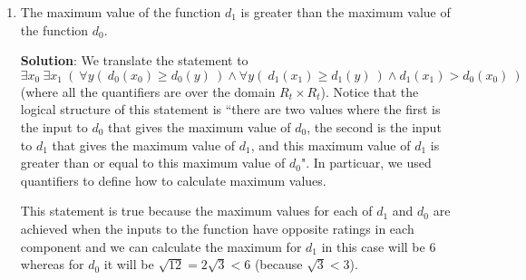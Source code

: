 \begin{enumerate}
\begin{enumerate}
\begin{enumerate}
            {\bf Solution}: We translate the statement to 
            \[
              \forall x \in Rt \times Rt ~(~d_0 (x) > d_1 (x)~)
            \]
            This statement is {\bf false}, as we can see from the counterexample $x = (~(1,0,-1), (1,0,-1)~) \in Rt\times Rt$. 
            Using the definitions of the functions
            \[
              d_0(x) = \sqrt{ (1-1)^2 + (0-0)^2 + (-1--1)^2} = \sqrt{0 + 0 + 0} = 0
            \]
            and
            \[
              d_1(x) = |1-1| + |0-0| + |-1--1| = 0 + 0 + 0 =0
            \]
            Since $d_0(x) = d_1(x)$, it is not the case that $d_0(x) > d_1(x)$.

            \item The maximum value of the function $d_1$ is greater than the maximum value of the function $d_0$.
            
            {\bf Solution}: We translate the statement to 
            \[  
            \exists x_0 ~\exists x_1  ~(~\forall y (~d_0(x_0) \geq d_0(y)~) \land \forall y (~d_1(x_1)\geq d_1(y)~) \land d_1(x_1) > d_0(x_0)~)
            \]
            (where all the quantifiers are over the domain $R_t \times R_t$). 
            Notice that the logical structure of this statement is
            ``there are two values where the first is the input to $d_0$ that gives the maximum value of $d_0$, 
            the second is the input to $d_1$ that gives the maximum value of $d_1$, and 
            this maximum value of $d_1$ is greater than or equal to this maximum value of $d_0$".
            In particuar, we used quantifiers to define how to calculate maximum values. 
            
            This statement is true
            because the maximum values for each of $d_1$ and $d_0$ are achieved when the inputs to the function 
            have opposite ratings in each component and we can calculate the maximum for $d_1$ in this case will 
            be $6$ whereas for $d_0$ it will be $\sqrt{12} = 2 \sqrt{3} < 6$ (because $\sqrt{3} < 3$). 
            

\end{enumerate}
\end{enumerate}
\end{enumerate}
